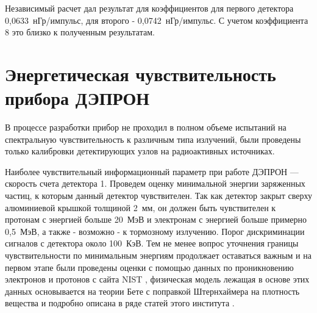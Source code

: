 Независимый расчет дал результат для коэффициентов для первого детектора 
0,0633~нГр/импульс, для второго -  0,0742~нГр/импульс. С учетом 
коэффициента 8 это близко к полученным результатам.

\section{Энергетическая чувствительность прибора ДЭПРОН} \label{sec:energy}

В процессе разработки прибор не проходил в полном объеме испытаний на спектральную чувствительность к различным типа излучений, были проведены только калибровки детектирующих узлов на радиоактивных источниках.

Наиболее чувствительный информационный параметр при работе ДЭПРОН --- скорость счета детектора 1. Проведем оценку минимальной энергии заряженных частиц, к которым данный детектор чувствителен. Так как детектор закрыт сверху алюминиевой крышкой толщиной 2~мм, он должен быть чувствителен к протонам с энергией больше 20~МэВ и электронам с энергией больше примерно 0,5~МэВ, а также - возможно - к тормозному излучению. Порог дискриминации сигналов с детектора около 100~КэВ. Тем не менее вопрос уточнения границы чувствительности по минимальным энергиям продолжает оставаться важным и на первом этапе были проведены оценки с помощью данных по проникновению электронов и протонов с сайта NIST \cite{NIST}, физическая модель лежащая в основе этих данных основывается на теории Бете\cite{Bethe1930} с поправкой Штернхаймера \cite{Sternheimer1952} на плотность вещества и подробно описана в ряде статей этого института \cite{Bichsel1992, Ashley1972}.

